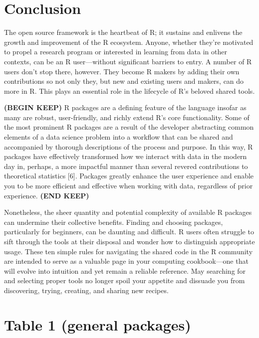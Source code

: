 \documentclass[10pt,letterpaper]{article}
\begin{document}
\hypertarget{conclusion}{%
\section{Conclusion}\label{conclusion}}

The open source framework is the heartbeat of R; it sustains and
enlivens the growth and improvement of the R ecosystem. Anyone, whether
they're motivated to propel a research program or interested in learning
from data in other contexts, can be an R user---without significant
barriers to entry. A number of R users don't stop there, however. They
become R makers by adding their own contributions so not only they, but
new and existing users and makers, can do more in R. This plays an
essential role in the lifecycle of R's beloved shared tools.

\textbf{(BEGIN KEEP)} R packages are a defining feature of the language
insofar as many are robust, user-friendly, and richly extend R's core
functionality. Some of the most prominent R packages are a result of the
developer abstracting common elements of a data science problem into a
workflow that can be shared and accompanied by thorough descriptions of
the process and purpose. In this way, R packages have effectively
transformed how we interact with data in the modern day in, perhaps, a
more impactful manner than several revered contributions to theoretical
statistics {[}6{]}. Packages greatly enhance the user experience and
enable you to be more efficient and effective when working with data,
regardless of prior experience. \textbf{(END KEEP)}

Nonetheless, the sheer quantity and potential complexity of available R
packages can undermine their collective benefits. Finding and choosing
packages, particularly for beginners, can be daunting and difficult. R
users often struggle to sift through the tools at their disposal and
wonder how to distinguish appropriate usage. These ten simple rules for
navigating the shared code in the R community are intended to serve as a
valuable page in your computing cookbook---one that will evolve into
intuition and yet remain a reliable reference. May searching for and
selecting proper tools no longer spoil your appetite and dissuade you
from discovering, trying, creating, and sharing new recipes.

\hypertarget{table-1-general-packages}{%
\section{Table 1 (general packages)}\label{table-1-general-packages}}
\end{document}
